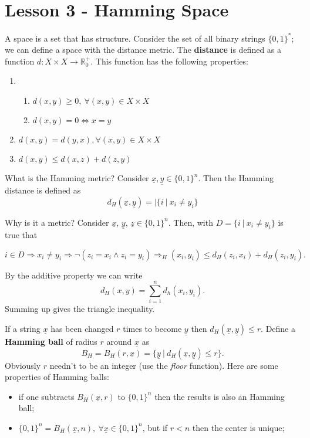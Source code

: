 \section{Lesson 3 - Hamming Space}

A space is a set that has structure. Consider the set of all binary strings $\{0, 1\}^*$; we can define a space with the distance metric. The \textbf{distance} is defined as a function $d: X \times X \rightarrow \mathbb{R}^+_0$. This function has the following properties:
\begin{enumerate}
	\item \begin{enumerate}
		\item $d(x, y) \geq 0,\ \forall (x, y) \in X \times X$
		\item $d(x, y) = 0 \Leftrightarrow x = y$
	\end{enumerate}
	\item $d(x, y) = d(y, x), \forall (x, y) \in X \times X$
	\item $d(x, y) \leq d(x, z) + d(z, y)$
\end{enumerate}

What is the Hamming metric? Consider $\underline{x}, \underline{y}  \in \{0, 1\}^n$. Then the Hamming distance is defined as
\begin{equation}
	d_H(\underline{x},\underline{y}) = |\{i\ |\ x_i \not= y_i\}
\end{equation}

Why is it a metric? Consider $\underline{x}$, $\underline{y}$, $\underline{z} \in \{0,1\}^n$. Then, with $D = \{i\ |\ x_i \not= y_i\}$ is true that 
\begin{center}
	\begin{math}i \in D \Rightarrow x_i \not=y_i \Rightarrow \neg (z_i = x_i \wedge z_i = y_i) \Rightarrow _H(x_i, y_i) \leq d_H(z_i, x_i) + d_H(z_i, y_i).
	\end{math}
\end{center}

By the additive property we can write $$d_H(x, y) = \sum_{i = 1}^n d_h(x_i, y_i).$$ Summing up gives the triangle inequality.

If a string $\underline{x}$ has been changed $r$ times to become $\underline{y}$ then $d_H(\underline{x}, \underline{y}) \leq r$. Define a \textbf{Hamming ball} of radius $r$ around $\underline{x}$ as 
$$B_H=B_H(r, \underline{x}) = \{\underline{y}\ |\ d_H(\underline{x}, \underline{y}) \leq r\}.$$
Obviously $r$ needn't to be an integer (use the \emph{floor} function). Here are some properties of Hamming balls:
\begin{itemize}
	\item if one subtracts $B_H(\underline{x}, r)$ to $\{0, 1\}^n$ then the results is also an Hamming ball;
	\item $\{0, 1\}^n = B_H(\underline{x}, n),\ \forall \underline{x} \in \{0, 1\}^n$, but if $r < n$ then the center is unique;
\end{itemize}

